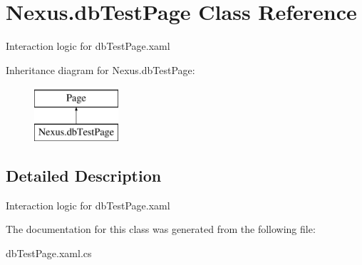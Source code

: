 \hypertarget{class_nexus_1_1db_test_page}{}\section{Nexus.\+db\+Test\+Page Class Reference}
\label{class_nexus_1_1db_test_page}


Interaction logic for db\+Test\+Page.\+xaml  


Inheritance diagram for Nexus.\+db\+Test\+Page\+:\begin{figure}[H]
\begin{center}
\leavevmode
\includegraphics[height=2.000000cm]{class_nexus_1_1db_test_page}
\end{center}
\end{figure}


\subsection{Detailed Description}
Interaction logic for db\+Test\+Page.\+xaml 



The documentation for this class was generated from the following file\+:\begin{DoxyCompactItemize}
\item 
db\+Test\+Page.\+xaml.\+cs\end{DoxyCompactItemize}
